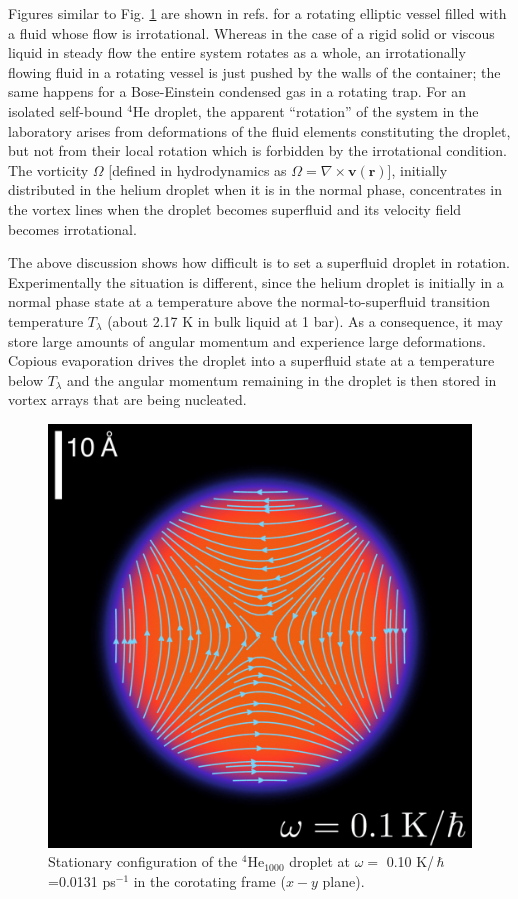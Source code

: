Figures similar to Fig. \ref{fig8-capture} are shown 
in refs. \citep{Sei94,Boh75} for a rotating  
elliptic vessel  filled with  a fluid whose flow is irrotational.
Whereas in the case of a rigid solid or viscous liquid in steady flow
the entire system rotates as a whole, 
an irrotationally flowing  fluid
in a rotating vessel is just pushed
 by the walls of the
container; the same happens for a Bose-Einstein condensed 
gas in a rotating trap.\citep{Rec01} For an isolated
self-bound $^4$He droplet, 
the apparent ``rotation''  of the 
system in the laboratory arises from deformations of the fluid elements constituting the droplet, but not from their local rotation which is forbidden
by the irrotational condition. The vorticity  $\Omega$  [defined in hydrodynamics as\citep{Guy15}  $\Omega= \nabla \times \mathbf{v}(\mathbf{r})$], 
initially distributed in the helium droplet when it is in the normal phase,  concentrates in the
vortex lines when the droplet becomes superfluid and its velocity field becomes irrotational. 

The above discussion shows how difficult is to set a superfluid droplet in rotation.
Experimentally \citep{Gom14,Jon16,Ber17} 
the situation is different, since  the helium 
droplet is initially in a normal phase state at a temperature above 
the normal-to-superfluid transition temperature 
$T_{\lambda}$ (about 2.17 K in bulk liquid at 1 bar). As a 
consequence, it may store large amounts of  
angular momentum and experience large deformations. 
Copious  evaporation drives the droplet into a 
superfluid state at a temperature below $T_{\lambda}$ and 
the  angular momentum remaining in the droplet is then  stored 
 in vortex arrays that are being nucleated. 
  
\begin{figure}[h]
\centerline{\includegraphics[width=0.7\linewidth,clip]{fig8}}
\caption{\label{fig8-capture}
 Stationary  configuration of the  $^4$He$_{1000}$ droplet at $\omega=$ 0.10 K/$\,\hbar$=0.0131 ps$^{-1}$ in the corotating frame ($x-y$ plane).
}
\end{figure}

